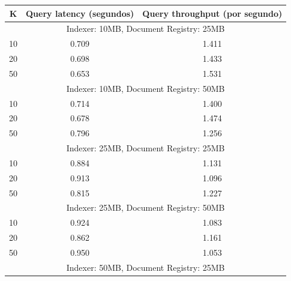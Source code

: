 \documentclass[12pt]{article}
\begin{document}
\begin{center}
    \small
    \begin{tabular}{| c | c | c |}
        \hline
        K
        & \bf Query latency (segundos)
        & \bf Query throughput (por segundo) \\ \hline

        \multicolumn{3}{|c|}{Indexer: 10MB, Document Registry: 25MB} \\ \hline

        10
        & 0.709
        & 1.411 \\ \hline

        20
        & 0.698
        & 1.433 \\ \hline

        50
        & 0.653
        & 1.531 \\ \hline

        \multicolumn{3}{|c|}{Indexer: 10MB, Document Registry: 50MB} \\ \hline

        10
        & 0.714
        & 1.400 \\ \hline

        20
        & 0.678
        & 1.474 \\ \hline

        50
        & 0.796
        & 1.256 \\ \hline

        \multicolumn{3}{|c|}{Indexer: 25MB, Document Registry: 25MB} \\ \hline

        10
        & 0.884
        & 1.131 \\ \hline

        20
        & 0.913
        & 1.096 \\ \hline

        50
        & 0.815
        & 1.227 \\ \hline

        \multicolumn{3}{|c|}{Indexer: 25MB, Document Registry: 50MB} \\ \hline

        10
        & 0.924
        & 1.083 \\ \hline

        20
        & 0.862
        & 1.161 \\ \hline

        50
        & 0.950
        & 1.053 \\ \hline

        \multicolumn{3}{|c|}{Indexer: 50MB, Document Registry: 25MB} \\ \hline


\end{tabular}
\end{center}
\end{document}
